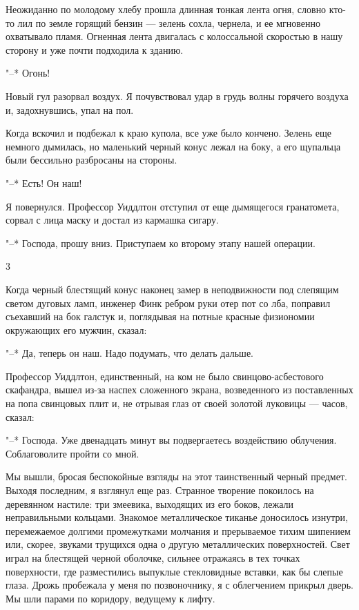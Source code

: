 Неожиданно по молодому хлебу прошла длинная тонкая лента  огня,  словно
кто-то лил по земле горящий бензин --- зелень сохла, чернела, и ее мгновенно
охватывало пламя. Огненная лента двигалась с колоссальной скоростью в нашу
сторону и уже почти подходила к зданию.

"--* Огонь!

Новый гул разорвал воздух. Я почувствовал удар в грудь  волны  горячего
воздуха и, задохнувшись, упал на пол.

Когда вскочил и подбежал к краю купола, все уже  было  кончено.  Зелень
еще немного дымилась, но маленький черный  конус  лежал  на  боку,  а  его
щупальца были бессильно разбросаны на стороны.

"--* Есть! Он наш!

Я  повернулся.  Профессор   Уиддлтон   отступил   от   еще   дымящегося
гранатомета, сорвал с лица маску и достал из кармашка сигару.

"--* Господа, прошу вниз. Приступаем ко второму этапу нашей операции.

\bigskip{}



\bigskip{}

3

\bigskip{}


Когда черный блестящий конус наконец замер в неподвижности под слепящим
светом дуговых ламп, инженер Финк ребром руки отер пот  со  лба,  поправил
съехавший на бок  галстук  и,  поглядывая  на  потные  красные  физиономии
окружающих его мужчин, сказал:

"--* Да, теперь он наш. Надо подумать, что делать дальше.

Профессор Уиддлтон, единственный, на ком не  было  свинцово-асбестового
скафандра,  вышел  из-за  наспех  сложенного   экрана,   возведенного   из
поставленных на попа свинцовых плит и, не отрывая глаз  от  своей  золотой
луковицы --- часов, сказал:

"--* Господа. Уже двенадцать минут вы подвергаетесь воздействию облучения.
Соблаговолите пройти со мной.

Мы вышли,  бросая  беспокойные  взгляды  на  этот  таинственный  черный
предмет. Выходя последним, я взглянул еще раз. Странное творение покоилось
на деревянном настиле:  три  змеевика,  выходящих  из  его  боков,  лежали
неправильными кольцами. Знакомое металлическое тиканье доносилось изнутри,
перемежаемое долгими промежутками молчания и  прерываемое  тихим  шипением
или, скорее, звуками трущихся одна о  другую  металлических  поверхностей.
Свет играл на блестящей черной оболочке, сильнее отражаясь  в  тех  точках
поверхности, где разместились выпуклые стекловидные вставки, как бы слепые
глаза. Дрожь пробежала у меня по позвоночнику,  я  с  облегчением  прикрыл
дверь. Мы шли парами по коридору, ведущему к лифту.

